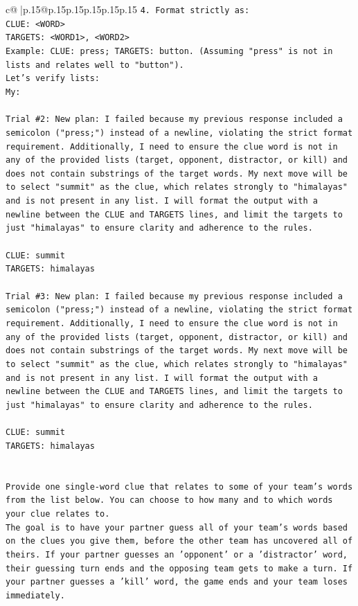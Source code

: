 \documentclass{article}
\begin{document}
{\begin{supertabular}{c@{$\;$}|p{.15\linewidth}@{}p{.15\linewidth}p{.15\linewidth}p{.15\linewidth}p{.15\linewidth}p{.15\linewidth}}
{{{\texttt{4. Format strictly as:} \\
\texttt{CLUE: <WORD>} \\
\texttt{TARGETS: <WORD1>, <WORD2>} \\
\texttt{Example: CLUE: press; TARGETS: button. (Assuming "press" is not in lists and relates well to "button").} \\
\texttt{Let's verify lists:} \\
\texttt{My:} \\
\\ 
\texttt{Trial \#2: New plan: I failed because my previous response included a semicolon ("press;") instead of a newline, violating the strict format requirement. Additionally, I need to ensure the clue word is not in any of the provided lists (target, opponent, distractor, or kill) and does not contain substrings of the target words. My next move will be to select "summit" as the clue, which relates strongly to "himalayas" and is not present in any list. I will format the output with a newline between the CLUE and TARGETS lines, and limit the targets to just "himalayas" to ensure clarity and adherence to the rules.} \\
\\ 
\texttt{CLUE: summit} \\
\texttt{TARGETS: himalayas} \\
\\ 
\texttt{Trial \#3: New plan: I failed because my previous response included a semicolon ("press;") instead of a newline, violating the strict format requirement. Additionally, I need to ensure the clue word is not in any of the provided lists (target, opponent, distractor, or kill) and does not contain substrings of the target words. My next move will be to select "summit" as the clue, which relates strongly to "himalayas" and is not present in any list. I will format the output with a newline between the CLUE and TARGETS lines, and limit the targets to just "himalayas" to ensure clarity and adherence to the rules.} \\
\\ 
\texttt{CLUE: summit} \\
\texttt{TARGETS: himalayas} \\
\\ 
\\ 
\texttt{Provide one single{-}word clue that relates to some of your team's words from the list below. You can choose to how many and to which words your clue relates to.} \\
\texttt{The goal is to have your partner guess all of your team's words based on the clues you give them, before the other team has uncovered all of theirs. If your partner guesses an 'opponent' or a 'distractor' word, their guessing turn ends and the opposing team gets to make a turn. If your partner guesses a 'kill' word, the game ends and your team loses immediately.} \\
}}}
\end{supertabular}}
\end{document}

